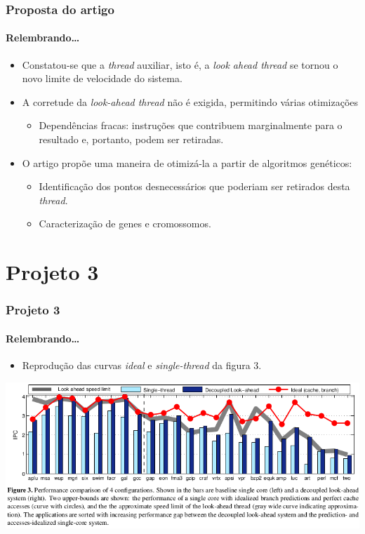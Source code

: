 \documentclass[10pt]{beamer}
\begin{document}
\begin{frame}
\frametitle{Proposta do artigo}
\framesubtitle{Relembrando\ldots}

\begin{itemize}
\item Constatou-se que a \textit{thread} auxiliar, isto é, a \textit{look ahead
thread} se tornou o novo limite de velocidade do sistema.

\vspace{12pt}

\item A corretude da \textit{look-ahead thread} não é exigida, permitindo várias
otimizações

\begin{itemize} 
	\item Dependências fracas: instruções que contribuem marginalmente para o
	resultado e, portanto, podem ser retiradas.
	
\end{itemize} 

\vspace{12pt}

\item O artigo propõe uma
maneira de otimizá-la a partir de algoritmos genéticos:
 
\begin{itemize} 
	\item Identificação dos pontos desnecessários que poderiam ser retirados desta
	\textit{thread}. 
  
  	\item Caracterização de genes e cromossomos. 
	
\end{itemize} 
\end{itemize}

\end{frame}

\section{Projeto 3}

\begin {frame}
\frametitle{Projeto 3}
\framesubtitle{Relembrando\ldots}
\begin{itemize}
\item Reprodução das curvas \textit{ideal} e \textit{single-thread} da figura 3.
\end{itemize}

\vspace{16pt}
\centering
\includegraphics[width=1\textwidth]{images/fig3} 
\end{frame}
\end{document}
